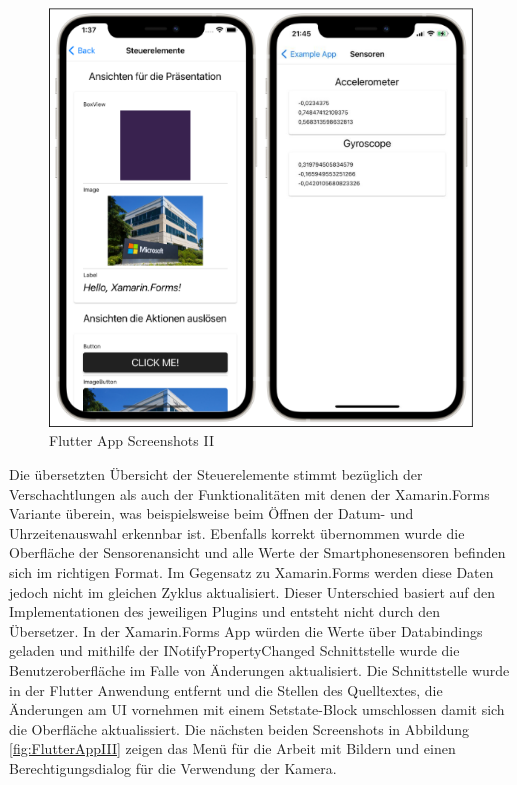 \newpage
\begin{figure}[!ht]
 \includegraphics[width=\textwidth,keepaspectratio]{Images/Screenshot/Sensors.png}
 \caption{Flutter App Screenshots II}
 \label{fig:FlutterAppII}
\end{figure}
Die übersetzten Übersicht der Steuerelemente stimmt  bezüglich der Verschachtlungen als auch der Funktionalitäten mit denen der Xamarin.Forms Variante überein,  was beispielsweise beim Öffnen der Datum- und Uhrzeitenauswahl erkennbar ist. Ebenfalls korrekt übernommen wurde die Oberfläche der Sensorenansicht und alle Werte der Smartphonesensoren befinden sich im richtigen Format. Im Gegensatz zu Xamarin.Forms werden diese Daten jedoch nicht im gleichen Zyklus aktualisiert.  Dieser Unterschied basiert auf den Implementationen des jeweiligen Plugins und entsteht nicht durch den Übersetzer.  In der Xamarin.Forms App würden die Werte über Databindings geladen und mithilfe der INotifyPropertyChanged Schnittstelle wurde die Benutzeroberfläche im Falle von Änderungen aktualisiert.  Die Schnittstelle wurde in der Flutter Anwendung entfernt und die Stellen des Quelltextes, die Änderungen am UI vornehmen mit einem Setstate-Block umschlossen damit sich die Oberfläche aktualissiert.  Die nächsten beiden Screenshots in Abbildung \ref{fig:FlutterAppIII} zeigen das Menü für die Arbeit mit Bildern und einen Berechtigungsdialog für die Verwendung der Kamera.


